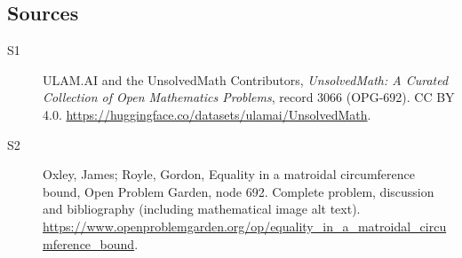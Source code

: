 \documentclass[11pt]{book}
\begin{document}
\subsection{Sources}
\begin{description}
\item[\hypertarget{source:3066:1}{S1}] ULAM.AI and the UnsolvedMath Contributors, \emph{UnsolvedMath: A Curated Collection of Open Mathematics Problems}, record 3066 (OPG-692). CC BY 4.0. \url{https://huggingface.co/datasets/ulamai/UnsolvedMath}.
\item[\hypertarget{source:3066:2}{S2}] Oxley, James; Royle, Gordon, Equality in a matroidal circumference bound, Open Problem Garden, node 692. Complete problem, discussion and bibliography (including mathematical image alt text). \url{https://www.openproblemgarden.org/op/equality_in_a_matroidal_circumference_bound}.
\end{description}
\label{end:3066}
\end{document}
